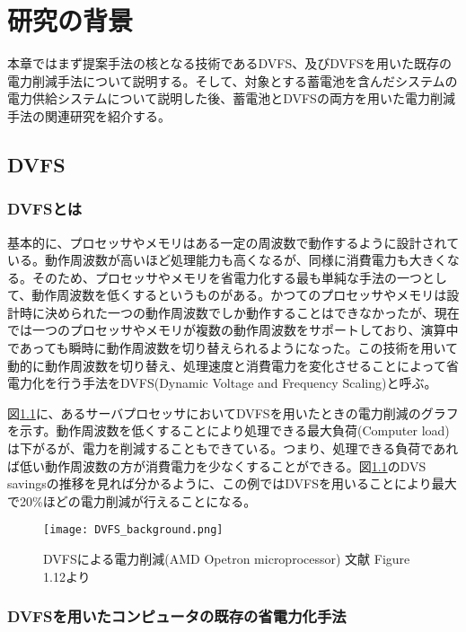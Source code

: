 \chapter{研究の背景}
\label{chap:background}

本章ではまず提案手法の核となる技術であるDVFS、及びDVFSを用いた既存の電力削減手法について説明する。そして、対象とする蓄電池を含んだシステムの電力供給システムについて説明した後、蓄電池とDVFSの両方を用いた電力削減手法の関連研究を紹介する。

\section{DVFS}
\label{sec:dvfs}

\subsection{DVFSとは}

基本的に、プロセッサやメモリはある一定の周波数で動作するように設計されている。動作周波数が高いほど処理能力も高くなるが、同様に消費電力も大きくなる。そのため、プロセッサやメモリを省電力化する最も単純な手法の一つとして、動作周波数を低くするというものがある。かつてのプロセッサやメモリは設計時に決められた一つの動作周波数でしか動作することはできなかったが、現在では一つのプロセッサやメモリが複数の動作周波数をサポートしており、演算中であっても瞬時に動作周波数を切り替えられるようになった。この技術を用いて動的に動作周波数を切り替え、処理速度と消費電力を変化させることによって省電力化を行う手法をDVFS(Dynamic Voltage and Frequency Scaling)と呼ぶ。

図\ref{fig:dvfs_background}に、あるサーバプロセッサにおいてDVFSを用いたときの電力削減のグラフを示す\cite{Hennessy:2011:CAF:1999263}。動作周波数を低くすることにより処理できる最大負荷(Computer load)は下がるが、電力を削減することもできている。つまり、処理できる負荷であれば低い動作周波数の方が消費電力を少なくすることができる。図\ref{fig:dvfs_background}のDVS savingsの推移を見れば分かるように、この例ではDVFSを用いることにより最大で20\%ほどの電力削減が行えることになる。
\begin{figure}[t]
 \begin{center}
  \texttt{[image: DVFS\_background.png]}
 \end{center}
 \caption{DVFSによる電力削減(AMD Opetron microprocessor) 文献\cite{Hennessy:2011:CAF:1999263} Figure 1.12より}
 \label{fig:dvfs_background}
\end{figure}


\subsection{DVFSを用いたコンピュータの既存の省電力化手法}

